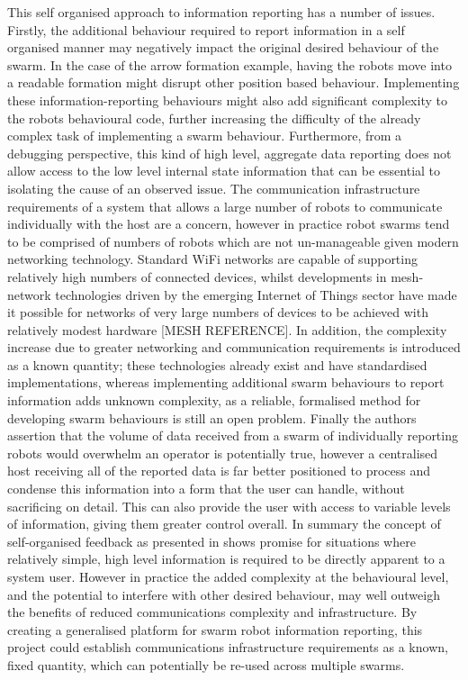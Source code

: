 This self organised approach to information reporting \cite{Podevijn:2012} has a number of issues. Firstly, the additional behaviour required to report information in a self organised manner may negatively impact the original desired behaviour of the swarm. In the case of the arrow formation example, having the robots move into a readable formation might disrupt other position based behaviour. Implementing these information-reporting behaviours might also add significant complexity to the robots behavioural code, further increasing the difficulty of the already complex task of implementing a swarm behaviour. Furthermore, from a debugging perspective, this kind of high level, aggregate data reporting does not allow access to the low level internal state information that can be essential to isolating the cause of an observed issue. The communication infrastructure requirements of a system that allows a large number of robots to communicate individually with the host are a concern, however in practice robot swarms tend to be comprised of numbers of robots which are not un-manageable given modern networking technology. Standard WiFi networks are capable of supporting relatively high numbers of connected devices, whilst developments in mesh-network technologies driven by the emerging Internet of Things sector have made it possible for networks of very large numbers of devices to be achieved with relatively modest hardware [MESH REFERENCE]. In addition, the complexity increase due to greater networking and communication requirements is introduced as a known quantity; these technologies already exist and have standardised implementations, whereas implementing additional swarm behaviours to report information adds unknown complexity, as a reliable, formalised method for developing swarm behaviours is still an open problem. Finally the authors assertion that the volume of data received from a swarm of individually reporting robots would overwhelm an operator is potentially true, however a centralised host receiving all of the reported data is far better positioned to process and condense this information into a form that the user can handle, without sacrificing on detail. This can also provide the user with access to variable levels of information, giving them greater control overall. In summary the concept of self-organised feedback as presented in \cite{Podevijn:2012} shows promise for situations where relatively simple, high level information is required to be directly apparent to a system user. However in practice the added complexity at the behavioural level, and the potential to interfere with other desired behaviour, may well outweigh the benefits of reduced communications complexity and infrastructure. By creating a generalised platform for swarm robot information reporting, this project could establish communications infrastructure requirements as a known, fixed quantity, which can potentially be re-used across multiple swarms.

